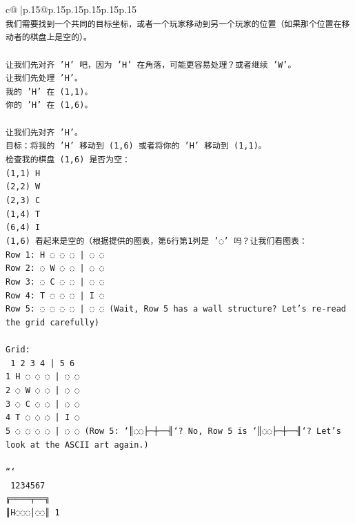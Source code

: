\documentclass{article}
\begin{document}
{\begin{supertabular}{c@{$\;$}|p{.15\linewidth}@{}p{.15\linewidth}p{.15\linewidth}p{.15\linewidth}p{.15\linewidth}p{.15\linewidth}}
{{{\\ 
\texttt{我们需要找到一个共同的目标坐标，或者一个玩家移动到另一个玩家的位置（如果那个位置在移动者的棋盘上是空的）。} \\
\\ 
\texttt{让我们先对齐 'H' 吧，因为 'H' 在角落，可能更容易处理？或者继续 'W'。} \\
\texttt{让我们先处理 'H'。} \\
\texttt{我的 'H' 在 (1,1)。} \\
\texttt{你的 'H' 在 (1,6)。} \\
\\ 
\texttt{让我们先对齐 'H'。} \\
\texttt{目标：将我的 'H' 移动到 (1,6) 或者将你的 'H' 移动到 (1,1)。} \\
\texttt{检查我的棋盘 (1,6) 是否为空：} \\
\texttt{(1,1) H} \\
\texttt{(2,2) W} \\
\texttt{(2,3) C} \\
\texttt{(1,4) T} \\
\texttt{(6,4) I} \\
\texttt{(1,6) 看起来是空的（根据提供的图表，第6行第1列是 '◌' 吗？让我们看图表：} \\
\texttt{Row 1: H ◌ ◌ ◌ | ◌ ◌} \\
\texttt{Row 2: ◌ W ◌ ◌ | ◌ ◌} \\
\texttt{Row 3: ◌ C ◌ ◌ | ◌ ◌} \\
\texttt{Row 4: T ◌ ◌ ◌ | I ◌} \\
\texttt{Row 5: ◌ ◌ ◌ ◌ | ◌ ◌ (Wait, Row 5 has a wall structure? Let's re{-}read the grid carefully)} \\
\\ 
\texttt{Grid:} \\
\texttt{  1 2 3 4 | 5 6} \\
\texttt{1 H ◌ ◌ ◌ | ◌ ◌} \\
\texttt{2 ◌ W ◌ ◌ | ◌ ◌} \\
\texttt{3 ◌ C ◌ ◌ | ◌ ◌} \\
\texttt{4 T ◌ ◌ ◌ | I ◌} \\
\texttt{5 ◌ ◌ ◌ ◌ | ◌ ◌  (Row 5: `║◌◌├─┼──╢`? No, Row 5 is `║◌◌├─┼──╢`? Let's look at the ASCII art again.)} \\
\\ 
\texttt{```} \\
\texttt{ 1234567} \\
\texttt{╔════╤══╗} \\
\texttt{║H◌◌◌│◌◌║ 1} \\
}}}
\end{supertabular}}
\end{document}
